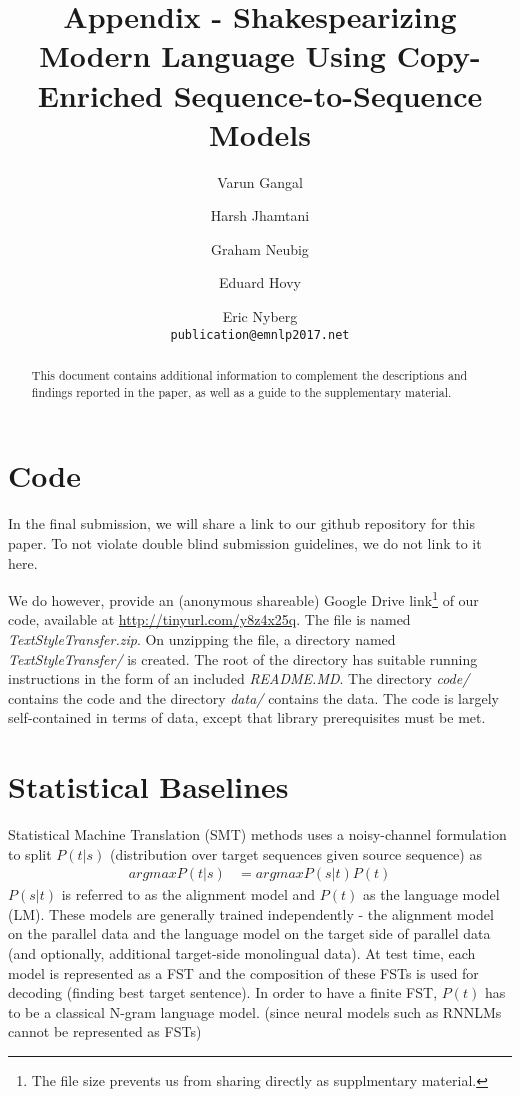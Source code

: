 \documentclass[11pt,letterpaper]{article}
\title{Appendix - Shakespearizing Modern Language Using Copy-Enriched Sequence-to-Sequence Models}
\author{Varun Gangal \and Harsh Jhamtani \and Graham Neubig \and Eduard Hovy \and Eric Nyberg \\
  {\tt publication@emnlp2017.net}}
\date{}
\begin{document}
\maketitle

\begin{abstract}
    This document contains additional information to complement the descriptions and findings reported in the paper, as well as a guide to the supplementary material.
\end{abstract}

\section{Code}
In the final submission, we will share a link to our github repository for this paper. To not violate double blind submission guidelines, we do not link to it here. 

We do however, provide an (anonymous shareable) Google Drive link\footnote{The file size prevents us from sharing directly as supplmentary material.} of our code, available at \url{http://tinyurl.com/y8z4x25q}. The file is named \textit{TextStyleTransfer.zip}. On unzipping the file, a directory named \textit{TextStyleTransfer/} is created. The root of the directory has suitable running instructions in the form of an included \textit{README.MD}. The directory \textit{code/} contains the code and the directory \textit{data/} contains the data. The code is largely self-contained in terms of data, except that library prerequisites must be met.


\section{Statistical Baselines}
Statistical Machine Translation (SMT) methods uses a noisy-channel formulation to split $P(t|s)$ (distribution over target sequences given source sequence) as
\begin{align*}
    argmax P(t|s) &= argmax P(s|t) P(t)
\end{align*}
$P(s|t)$ is referred to as the alignment model and $P(t)$ as the language model (LM). These models are generally trained independently - the alignment model on the parallel data and the language model on the target side of parallel data (and optionally, additional target-side monolingual data). At test time, each model is represented as a FST and the composition of these FSTs is used for decoding (finding best target sentence). In order to have a finite FST, $P(t)$ has to be a classical N-gram language model. (since neural models such as RNNLMs cannot be represented as FSTs)
\end{document}
